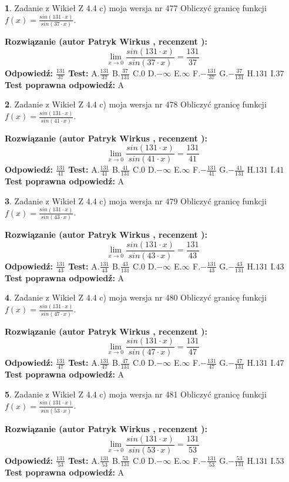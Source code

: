 \documentclass[12pt, a4paper]{article}
\theoremstyle{definition} %
\newtheorem{zad}{}
\newcommand{\zadStart}[1]{\begin{zad}#1\newline}
\newcommand{\zadStop}{\end{zad}}
\newcommand{\rozwStart}[2]{\noindent \textbf{Rozwiązanie (autor #1 , recenzent #2): }\newline}
\newcommand{\rozwStop}{\newline}
\newcommand{\odpStart}{\noindent \textbf{Odpowiedź:}\newline}
\newcommand{\odpStop}{\newline}
\newcommand{\testStart}{\noindent \textbf{Test:}\newline}
\newcommand{\testStop}{\newline}
\newcommand{\kluczStart}{\noindent \textbf{Test poprawna odpowiedź:}\newline}
\newcommand{\kluczStop}{\newline}
\begin{document}
\zadStart{Zadanie z Wikieł Z 4.4 c) moja wersja nr 477}
Obliczyć granicę funkcji $f(x)=\frac{sin(131\cdot x)}{sin(37\cdot x)}$.
\zadStop
\rozwStart{Patryk Wirkus}{}
$$\lim\limits_{x\to 0}\frac{sin(131\cdot x)}{sin(37\cdot x)}=
\frac{131}{37}$$
\rozwStop
\odpStart
$\frac{131}{37}$
\odpStop
\testStart
A.$\frac{131}{37}$
B.$\frac{37}{131}$
C.$0$
D.$-\infty$
E.$\infty$
F.$-\frac{131}{37}$
G.$-\frac{37}{131}$
H.$131$
I.$37$
\testStop
\kluczStart
A
\kluczStop



\zadStart{Zadanie z Wikieł Z 4.4 c) moja wersja nr 478}
Obliczyć granicę funkcji $f(x)=\frac{sin(131\cdot x)}{sin(41\cdot x)}$.
\zadStop
\rozwStart{Patryk Wirkus}{}
$$\lim\limits_{x\to 0}\frac{sin(131\cdot x)}{sin(41\cdot x)}=
\frac{131}{41}$$
\rozwStop
\odpStart
$\frac{131}{41}$
\odpStop
\testStart
A.$\frac{131}{41}$
B.$\frac{41}{131}$
C.$0$
D.$-\infty$
E.$\infty$
F.$-\frac{131}{41}$
G.$-\frac{41}{131}$
H.$131$
I.$41$
\testStop
\kluczStart
A
\kluczStop



\zadStart{Zadanie z Wikieł Z 4.4 c) moja wersja nr 479}
Obliczyć granicę funkcji $f(x)=\frac{sin(131\cdot x)}{sin(43\cdot x)}$.
\zadStop
\rozwStart{Patryk Wirkus}{}
$$\lim\limits_{x\to 0}\frac{sin(131\cdot x)}{sin(43\cdot x)}=
\frac{131}{43}$$
\rozwStop
\odpStart
$\frac{131}{43}$
\odpStop
\testStart
A.$\frac{131}{43}$
B.$\frac{43}{131}$
C.$0$
D.$-\infty$
E.$\infty$
F.$-\frac{131}{43}$
G.$-\frac{43}{131}$
H.$131$
I.$43$
\testStop
\kluczStart
A
\kluczStop



\zadStart{Zadanie z Wikieł Z 4.4 c) moja wersja nr 480}
Obliczyć granicę funkcji $f(x)=\frac{sin(131\cdot x)}{sin(47\cdot x)}$.
\zadStop
\rozwStart{Patryk Wirkus}{}
$$\lim\limits_{x\to 0}\frac{sin(131\cdot x)}{sin(47\cdot x)}=
\frac{131}{47}$$
\rozwStop
\odpStart
$\frac{131}{47}$
\odpStop
\testStart
A.$\frac{131}{47}$
B.$\frac{47}{131}$
C.$0$
D.$-\infty$
E.$\infty$
F.$-\frac{131}{47}$
G.$-\frac{47}{131}$
H.$131$
I.$47$
\testStop
\kluczStart
A
\kluczStop



\zadStart{Zadanie z Wikieł Z 4.4 c) moja wersja nr 481}
Obliczyć granicę funkcji $f(x)=\frac{sin(131\cdot x)}{sin(53\cdot x)}$.
\zadStop
\rozwStart{Patryk Wirkus}{}
$$\lim\limits_{x\to 0}\frac{sin(131\cdot x)}{sin(53\cdot x)}=
\frac{131}{53}$$
\rozwStop
\odpStart
$\frac{131}{53}$
\odpStop
\testStart
A.$\frac{131}{53}$
B.$\frac{53}{131}$
C.$0$
D.$-\infty$
E.$\infty$
F.$-\frac{131}{53}$
G.$-\frac{53}{131}$
H.$131$
I.$53$
\testStop
\kluczStart
A
\kluczStop
\end{document}
